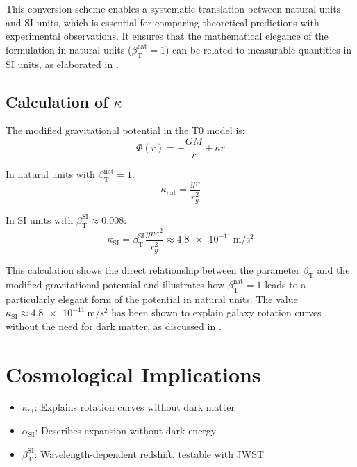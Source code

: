 \documentclass[12pt,a4paper]{article}
\newcommand{\betaT}{\beta_{\text{T}}}
\begin{document}
	This conversion scheme enables a systematic translation between natural units and SI units, which is essential for comparing theoretical predictions with experimental observations. It ensures that the mathematical elegance of the formulation in natural units (\(\betaT^{\text{nat}} = 1\)) can be related to measurable quantities in SI units, as elaborated in \cite{pascher_alphabeta_2025}.
	
	\subsection{Calculation of \(\kappa\)}
	\label{subsec:calculation_kappa}
	
	The modified gravitational potential in the T0 model is:
	\begin{equation}
		\Phi(r) = -\frac{G M}{r} + \kappa r
	\end{equation}
	
	In natural units with \(\betaT^{\text{nat}} = 1\):
	\begin{equation}
		\kappa_{\text{nat}} = \frac{y v}{r_g^2}
	\end{equation}
	
	In SI units with \(\betaT^{\text{SI}} \approx 0.008\):
	\begin{equation}
		\kappa_{\text{SI}} = \betaT^{\text{SI}} \frac{y v c^2}{r_g^2} \approx \SI{4.8e-11}{\meter\per\second\squared}
	\end{equation}
	
	This calculation shows the direct relationship between the parameter \(\betaT\) and the modified gravitational potential and illustrates how \(\betaT^{\text{nat}} = 1\) leads to a particularly elegant form of the potential in natural units. The value \(\kappa_{\text{SI}} \approx \SI{4.8e-11}{\meter\per\second\squared}\) has been shown to explain galaxy rotation curves without the need for dark matter, as discussed in \cite{pascher_galaxies_2025}.
	
	\section{Cosmological Implications}
	\label{sec:cosmological_implications}
	
	\begin{itemize}
		\item \(\kappa_{\text{SI}}\): Explains rotation curves without dark matter
		\item \(\alpha_{\text{SI}}\): Describes expansion without dark energy
		\item \(\betaT^{\text{SI}}\): Wavelength-dependent redshift, testable with JWST
	\end{itemize}
	
\end{document}
